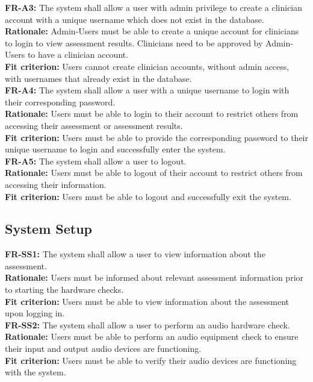 \documentclass[12pt]{article}
\begin{document}
\textbf{FR-A3: }The system shall allow a user with admin privilege to create a clinician account with a unique username which does not exist in the database.\\
\textbf{Rationale: }Admin-Users must be able to create a unique account for clinicians to login to view assessment results. Clinicians need to be approved by Admin-Users to have a clinician account.\\
\textbf{Fit criterion: }Users cannot create clinician accounts, without admin access, with usernames that already exist in the database.\\

\textbf{FR-A4: }The system shall allow a user with a unique username to login with their corresponding password.\\
\textbf{Rationale: }Users must be able to login to their account to restrict others from accessing their assessment or assessment results.\\
\textbf{Fit criterion: }Users must be able to provide the corresponding password to their unique username to login and successfully enter the system.\\

\textbf{FR-A5: }The system shall allow a user to logout.\\
\textbf{Rationale: }Users must be able to logout of their account to restrict others from accessing their information.\\
\textbf{Fit criterion: }Users must be able to logout and successfully exit the system.\\

\subsection{System Setup}
\textbf{FR-SS1: }The system shall allow a user to view information about the assessment.\\
\textbf{Rationale: }Users must be informed about relevant assessment information prior to starting the hardware checks.\\
\textbf{Fit criterion: }Users must be able to view information about the assessment upon logging in.\\

\textbf{FR-SS2: }The system shall allow a user to perform an audio hardware check.\\
\textbf{Rationale: }Users must be able to perform an audio equipment check to ensure their input and output audio devices are functioning.\\
\textbf{Fit criterion: }Users must be able to verify their audio devices are functioning with the system.\\
\end{document}
